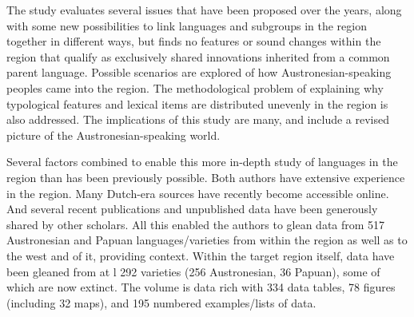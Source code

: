 The study evaluates several issues that have been proposed over the years,
along with some new possibilities to link languages
and subgroups in the region together in different ways,
but finds no features or sound changes within the region that qualify as exclusively
shared innovations inherited from a common parent language.
Possible scenarios are explored of how Austronesian-speaking peoples came into the region.
The methodological problem of explaining why typological features
and lexical items are distributed unevenly in the region is also addressed.
The implications of this study are many,
and include a revised picture of the Austronesian-speaking world.

Several factors combined to enable this more in-depth study
of languages in the region than has been previously possible.
Both authors have extensive experience in the region.
Many Dutch-era sources have recently become accessible online.
And several recent publications
and unpublished data have been generously shared by other scholars.
All this enabled the authors to glean data
from 517 Austronesian
and Papuan languages/varieties from within
the region as well as to the west and  of it,
providing context.
Within the target region itself,
data have been gleaned from at l 292 varieties
(256 Austronesian, 36 Papuan),
some of which are now extinct.
The volume is data rich with 334 data tables,
78 figures (including 32 maps),
and 195 numbered examples/lists of data.
